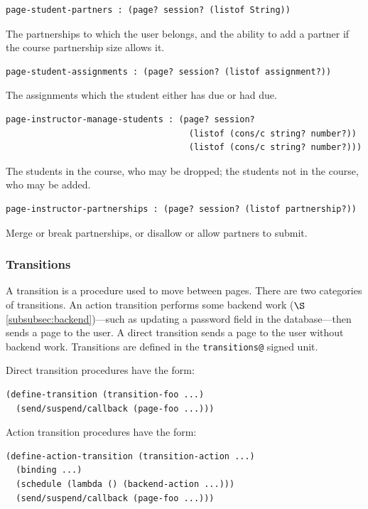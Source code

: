\documentclass[a4paper]{article}
\begin{document}
\begin{verbatim}
page-student-partners : (page? session? (listof String))
\end{verbatim}
The partnerships to which the user belongs, and the ability to add a partner if
the course partnership size allows it.

\begin{verbatim}
page-student-assignments : (page? session? (listof assignment?))
\end{verbatim}
The assignments which the student either has due or had due.

\begin{verbatim}
page-instructor-manage-students : (page? session?
                                    (listof (cons/c string? number?))
                                    (listof (cons/c string? number?)))
\end{verbatim}
The students in the course, who may be dropped; the students not in the course,
who may be added.

\begin{verbatim}
page-instructor-partnerships : (page? session? (listof partnership?))
\end{verbatim}
Merge or break partnerships, or disallow or allow partners to submit.

\subsubsection{Transitions}\label{subsubsec:transitions}

A transition is a procedure used to move between pages. There are two categories
of transitions. An action transition performs some backend work
($\S$\ref{subsubsec:backend})---such as updating a password field in the
database---then sends a page to the user. A direct transition sends a page to
the user without backend work. Transitions are defined in the
\verb|transitions@| signed unit.

Direct transition procedures have the form:

\begin{verbatim}
(define-transition (transition-foo ...)
  (send/suspend/callback (page-foo ...)))
\end{verbatim}

Action transition procedures have the form:

\begin{verbatim}
(define-action-transition (transition-action ...)
  (binding ...)
  (schedule (lambda () (backend-action ...)))
  (send/suspend/callback (page-foo ...)))
\end{verbatim}
\end{document}
